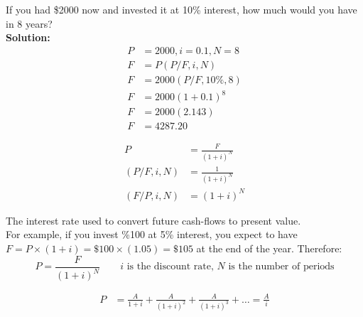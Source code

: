 \begin{example}
    If you had \$2000 now and invested it at 10\% interest, how much would you have in 8 years? \\
    \textbf{Solution:}
    \begin{align}
        P & = 2000, i = 0.1, N = 8 \\
        F & = P(P/F, i, N)         \\
        F & = 2000(P/F, 10\%, 8)   \\
        F & = 2000(1+0.1)^8        \\
        F & = 2000(2.143)          \\
        F & = 4287.20
    \end{align}
\end{example}
\begin{definition}
    \begin{align}
        P           & = \frac{F}{(1+i)^N} \\
        (P/F, i, N) & = \frac{1}{(1+i)^N} \\
        (F/P, i, N) & = (1+i)^N
    \end{align}
\end{definition}

\begin{definition}
    The interest rate used to convert future cash-flows to present value.\\
    For example, if you invest \%100 at 5\% interest, you expect to have $F = P \times (1+i) = \$100\times(1.05) = \$105$ at the end of the year. Therefore:
    \[
        P = \frac{F}{(1+i)^N} \qquad i \text{ is the discount rate, $N$ is the number of periods}
    \]
\end{definition}

\begin{definition}
    \begin{align}
        P & = \frac{A}{1 + i} + \frac{A}{(1+i)^2} + \frac{A}{(1+i)^3} + \ldots = \frac{A}{i}
    \end{align}
\end{definition}

